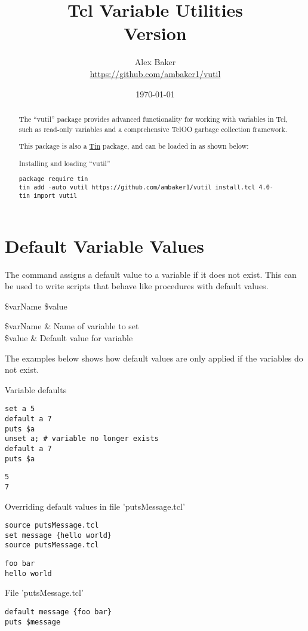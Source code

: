 \documentclass{article}
\title{\Huge Tcl Variable Utilities\\\small Version \version}
\author{Alex Baker\\\small\url{https://github.com/ambaker1/vutil}}
\date{\small\today}
\begin{document}
\maketitle
\begin{abstract}
\begin{center}
The ``vutil'' package provides advanced functionality for working with variables in Tcl, such as read-only variables and a comprehensive TclOO garbage collection framework.

This package is also a \textcolor{blue}{\href{https://github.com/ambaker1/Tin}{Tin}} package, and can be loaded in as shown below:
\end{center}
\begin{example}{Installing and loading ``vutil''}
\begin{lstlisting}
package require tin
tin add -auto vutil https://github.com/ambaker1/vutil install.tcl 4.0-
tin import vutil
\end{lstlisting}
\end{example}
\end{abstract}

\clearpage
\section{Default Variable Values}
The command  assigns a default value to a variable if it does not exist.
This can be used to write scripts that behave like procedures with default values.
\begin{syntax}
 \$varName \$value
\end{syntax}
\begin{args}
\$varName & Name of variable to set \\
\$value & Default value for variable
\end{args}

The examples below shows how default values are only applied if the variables do not exist.
\begin{example}{Variable defaults}
\begin{lstlisting}
set a 5
default a 7
puts $a
unset a; # variable no longer exists
default a 7
puts $a
\end{lstlisting}
\tcblower
\begin{lstlisting}
5
7
\end{lstlisting}
\end{example}
\begin{example}{Overriding default values in file 'putsMessage.tcl'}
\begin{lstlisting}
source putsMessage.tcl
set message {hello world}
source putsMessage.tcl
\end{lstlisting}
\tcblower
\begin{lstlisting}
foo bar
hello world
\end{lstlisting}
\end{example}
\begin{example}{File 'putsMessage.tcl'}
\begin{lstlisting}
default message {foo bar}
puts $message
\end{lstlisting}
\end{example}
\end{document}
